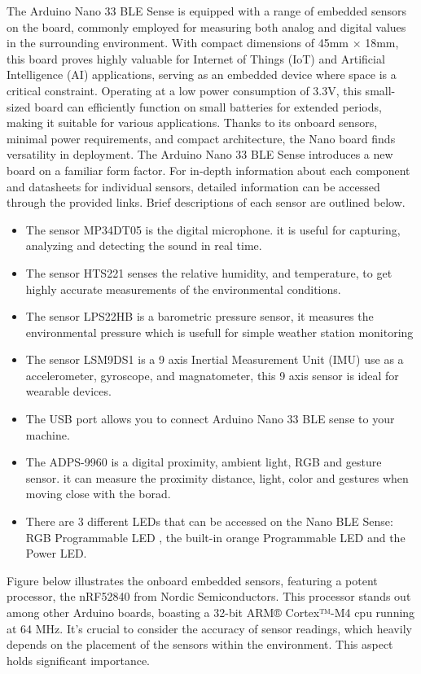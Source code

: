 The Arduino Nano 33 BLE Sense is equipped with a range of embedded sensors on the board, commonly employed for measuring both analog and digital values in the surrounding environment. With compact dimensions of 45mm × 18mm, this board proves highly valuable for Internet of Things (IoT) and Artificial Intelligence (AI) applications, serving as an embedded device where space is a critical constraint. Operating at a low power consumption of 3.3V, this small-sized board can efficiently function on small batteries for extended periods, making it suitable for various applications.\cite{Arduino:2023}
Thanks to its onboard sensors, minimal power requirements, and compact architecture, the Nano board finds versatility in deployment. The Arduino Nano 33 BLE Sense introduces a new board on a familiar form factor. For in-depth information about each component and datasheets for individual sensors, detailed information can be accessed through the provided links. Brief descriptions of each sensor are outlined below.

\begin{itemize}
	\item The sensor MP34DT05 is the digital microphone. it is useful for capturing,
	analyzing and detecting the sound in real time. 
	\item The sensor HTS221 senses the relative humidity, and temperature, to get highly
	accurate measurements of the environmental conditions.
	\item The sensor LPS22HB is a barometric pressure sensor, it measures the environmental pressure which is usefull for simple weather station monitoring
	\item The sensor LSM9DS1 is a 9 axis Inertial Measurement Unit (IMU) use as
	a accelerometer, gyroscope, and magnatometer, this 9 axis sensor is ideal for
	wearable devices.
	\item The USB port allows you to connect Arduino Nano 33 BLE sense to your
	machine.
	\item The ADPS-9960 is a digital proximity, ambient light, RGB and gesture sensor.
	it can measure the proximity distance, light, color and gestures when moving
	close with the borad.
	\item There are 3 different LEDs that can be accessed on the Nano BLE Sense: RGB
	Programmable LED , the built-in orange Programmable LED and the Power
	LED.
\end{itemize}

Figure below illustrates the onboard embedded sensors, featuring a potent processor, the nRF52840 from Nordic Semiconductors. This processor stands out among other Arduino boards, boasting a 32-bit ARM® Cortex™-M4 \ac{cpu} running at 64 MHz. It's crucial to consider the accuracy of sensor readings, which heavily depends on the placement of the sensors within the environment. This aspect holds significant importance.

